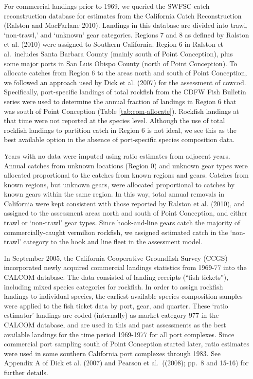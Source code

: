 \documentclass[
  english,
  a4paper,
]{article}
\begin{document}
For commercial landings prior to 1969, we queried the SWFSC catch reconstruction
database for estimates from the California Catch Reconstruction (Ralston and MacFarlane 2010).
Landings in this database are divided into trawl, `non-trawl,' and `unknown' gear
categories. Regions 7 and 8 as defined by Ralston et al. (2010) were
assigned to Southern California. Region 6 in Ralston et al.~includes Santa
Barbara County (mainly south of Point Conception), plus some major ports in San
Luis Obispo County (north of Point Conception). To allocate catches from Region
6 to the areas north and south of Point Conception, we followed an approach used
by Dick et al. (2007) for the assessment of cowcod. Specifically,
port-specific landings of total rockfish from the CDFW Fish Bulletin series were
used to determine the annual fraction of landings in Region 6 that was south of
Point Conception (Table \ref{tab:com-allocate}). Rockfish landings at that time
were not reported
at the species level. Although the use of total rockfish landings to partition
catch in Region 6 is not ideal, we see this as the best available option in the
absence of port-specific species composition data.

Years with no data were imputed
using ratio estimates from adjacent years. Annual catches from unknown locations
(Region 0) and unknown gear types were allocated proportional to the catches from
known regions and gears. Catches from known regions, but unknown gears, were
allocated proportional to catches by known gears within the same region. In this way,
total annual removals in California were kept consistent with those reported by
Ralston et al. (2010), and assigned to the assessment areas north and
south of Point Conception, and either trawl or `non-trawl' gear types. Since
hook-and-line gears catch the majority of
commercially-caught vermilion rockfish, we assigned estimated catch in the
`non-trawl' category to the hook and line fleet in the assessment model.

In September 2005, the California Cooperative Groundfish Survey (CCGS)
incorporated newly acquired commercial landings statistics from 1969-77 into
the CALCOM database. The data consisted of landing receipts (``fish tickets''),
including mixed species categories for rockfish. In order to assign rockfish
landings to individual species, the earliest available species composition
samples were applied to the fish ticket data by port, gear, and quarter. These
`ratio estimator' landings are coded (internally) as market category 977 in the
CALCOM database, and are used in this and past assessments as the best available
landings for the time period 1969-1977 for all port complexes. Since commercial
port sampling south of Point Conception started later, ratio estimates were used
in some southern California port complexes through 1983. See Appendix A of Dick
et al. (2007) and Pearson et al.~((2008); pp.~8 and 15-16) for
further details.
\end{document}

